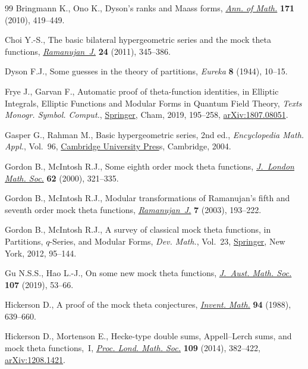 \begin{thebibliography}{99}
Bringmann K., Ono K., Dyson's ranks and {M}aass forms,
  \href{https://doi.org/10.4007/annals.2010.171.419}{\textit{Ann. of Math.}}
  \textbf{171} (2010), 419--449.

Choi Y.-S., The basic bilateral hypergeometric series and the mock theta
  functions,
  \href{https://doi.org/10.1007/s11139-010-9269-7}{\textit{Ramanujan~J.}}
  \textbf{24} (2011), 345--386.

Dyson F.J., Some guesses in the theory of partitions, \textit{Eureka}
  \textbf{8} (1944), 10--15.

Frye J., Garvan F., Automatic proof of theta-function identities, in Elliptic
  {I}ntegrals, {E}lliptic {F}unctions and {M}odular {F}orms in {Q}uantum
  {F}ield {T}heory, \textit{Texts Monogr. Symbol. Comput.},
  \href{https://doi.org/10.1007/978-3-030-04480-0_10}{Springer}, Cham, 2019,
  195--258, \href{http://arxiv.org/abs/1807.08051}{arXiv:1807.08051}.

Gasper G., Rahman M., Basic hypergeometric series, 2nd ed., \textit{Encyclopedia Math.
  Appl.}, Vol.~96,
  \href{https://doi.org/10.1017/CBO9780511526251}{Cambridge University Pres}s,
  Cambridge, 2004.

Gordon B., McIntosh R.J., Some eighth order mock theta functions,
  \href{https://doi.org/10.1112/S0024610700008735}{\textit{J.~London Math.
  Soc.}} \textbf{62} (2000), 321--335.

Gordon B., McIntosh R.J., Modular transformations of {R}amanujan's fifth and
  seventh order mock theta functions, \href{https://doi.org/10.1023/A:1026299229509}{\textit{Ramanujan~J.}} \textbf{7} (2003), 193--222.

Gordon B., McIntosh R.J., A survey of classical mock theta functions, in
  Partitions, {$q$}-{S}eries, and {M}odular {F}orms, \textit{Dev. Math.},
  Vol.~23, \href{https://doi.org/10.1007/978-1-4614-0028-8_9}{Springer}, New
  York, 2012, 95--144.

Gu N.S.S., Hao L.-J., On some new mock theta functions,
  \href{https://doi.org/10.1017/s1446788718000368}{\textit{J.~Aust. Math.
  Soc.}} \textbf{107} (2019), 53--66.

Hickerson D., A proof of the mock theta conjectures,
  \href{https://doi.org/10.1007/BF01394279}{\textit{Invent. Math.}} \textbf{94}
  (1988), 639--660.

Hickerson D., Mortenson E., Hecke-type double sums, {A}ppell--{L}erch sums, and
  mock theta functions,~{I},
  \href{https://doi.org/10.1112/plms/pdu007}{\textit{Proc. Lond. Math. Soc.}}
  \textbf{109} (2014), 382--422,
  \href{http://arxiv.org/abs/1208.1421}{arXiv:1208.1421}.


\end{thebibliography}
